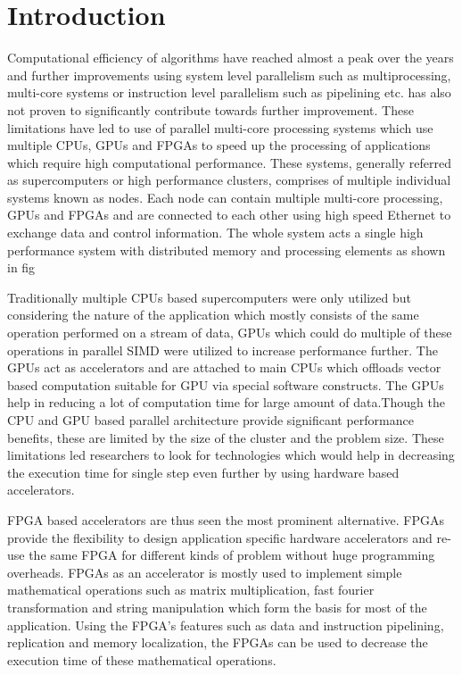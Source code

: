 \chapter{Introduction}
\label{cha:Introduction}

Computational efficiency of algorithms have reached almost a peak over the years
and further improvements using system level parallelism such as multiprocessing, multi-core systems
or instruction level parallelism such as pipelining etc. has also not proven to significantly contribute
towards further improvement. These limitations have led to use of parallel multi-core processing
systems which use multiple CPUs, GPUs and FPGAs to speed up the processing of applications
which require high computational performance. These systems, generally referred as supercomputers or
high performance clusters, comprises of multiple individual systems known as nodes. Each node
can contain multiple multi-core processing, GPUs and FPGAs and are connected to each other
using high speed Ethernet to exchange data and control information. The whole system acts
a single high performance system with distributed memory and processing elements as shown in fig


Traditionally multiple CPUs based supercomputers were only utilized but considering the nature
of the application which mostly consists of the same operation performed on a stream of data,
GPUs which could do multiple of these operations in parallel \ac{SIMD} were utilized
to increase performance further. The GPUs act as accelerators and are attached to main CPUs
which offloads vector based computation suitable for GPU via special software constructs.
The GPUs help in reducing a lot of computation time for large amount of data.Though the CPU
and GPU based parallel architecture provide significant performance benefits,
these are limited by the size of the cluster and the problem size. These limitations led
researchers to look for technologies which would help in decreasing the execution time for
single step even further by using hardware based accelerators.

FPGA based accelerators are thus seen the most prominent alternative. FPGAs provide the flexibility
to design application specific hardware accelerators and re-use the same FPGA for different kinds
of problem without huge programming overheads. FPGAs as an accelerator is mostly used to implement
simple mathematical operations such as matrix multiplication, fast fourier transformation and
string manipulation which form the basis for most of the application. Using the FPGA's features
such as data and instruction pipelining, replication and memory localization, the FPGAs can be
used to decrease the execution time of these mathematical operations.

